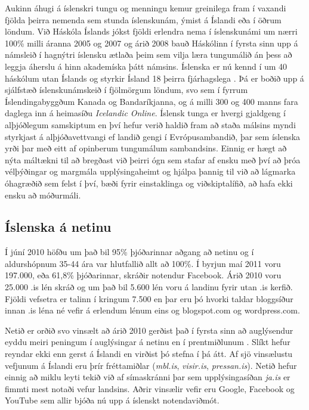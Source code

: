 \documentclass{../../metanetpaper}
\begin{document}
\begin{multicols}{2}
Aukinn áhugi á íslenskri tungu og menningu kemur greinilega fram í vaxandi fjölda þeirra nemenda sem stunda íslenskunám, ýmist á Íslandi eða í öðrum löndum. Við Háskóla Íslands jókst fjöldi erlendra nema í íslenskunámi um nærri 100\% milli áranna 2005 og 2007 og árið 2008 bauð Háskólinn í fyrsta sinn upp á námsleið í hagnýtri íslensku ætlaða þeim sem vilja læra tungumálið án þess að leggja áherslu á hinn akademíska þátt námsins. Íslenska er nú kennd í um 40 háskólum utan Íslands og styrkir Ísland 18 þeirra fjárhagslega \cite{isl1}.  Þá er boðið upp á sjálfstæð íslenskunámskeið í fjölmörgum löndum, svo sem í fyrrum Íslendingabyggðum Kanada og Bandaríkjanna, og á milli 300 og 400 manns fara daglega inn á heimasíðu \textit{Icelandic Online}\cite{iol1}.  Íslensk tunga er hvergi gjaldgeng í alþjóðlegum samskiptum en því hefur verið haldið fram að staða málsins myndi styrkjast á alþjóðavettvangi ef landið gengi í Evrópusambandið\cite{vis1}, þar sem íslenska yrði þar með eitt af opinberum tungumálum sambandsins\cite{enl1}.  Einnig er hægt að nýta máltækni til að bregðast við þeirri ógn sem stafar af ensku með því að þróa vélþýðingar og margmála upplýsingaheimt og hjálpa þannig til við að lágmarka óhagræðið sem felst í því, bæði fyrir einstaklinga og viðskiptalífið, að hafa ekki ensku að móðurmáli.

\subsection{Íslenska á netinu}

Í júní 2010 höfðu um það bil 95\% þjóðarinnar aðgang að netinu \cite{sta1} og í aldurshópnum 35-44 ára var hlutfallið allt að 100\%. Í byrjun maí 2011 voru 197.000, eða 61,8\% þjóðarinnar, skráðir notendur Facebook\cite{fac1}.   Árið 2010 voru 25.000 .is lén skráð\cite{len1} og um það bil 5.600 lén voru á landinu fyrir utan .is kerfið\cite{len2}. Fjöldi vefsetra er talinn í kringum 7.500 en þar eru þó hvorki taldar bloggsíður innan .is léna né vefir á erlendum lénum eins og blogspot.com og wordpress.com.

Netið er orðið svo vinsælt að árið 2010 gerðist það í fyrsta sinn að auglýsendur eyddu meiri peningum í auglýsingar á netinu en í prentmiðlunum \cite{abs1}. Slíkt hefur reyndar ekki enn gerst á Íslandi en virðist þó stefna í þá átt. Af sjö vinsælustu vefjunum á Íslandi eru þrír fréttamiðlar (\textit{mbl.is}, \textit{visir.is}, \textit{pressan.is}). Netið hefur einnig að miklu leyti tekið við af símaskránni þar sem upplýsingasíðan \textit{ja.is} er fimmti mest notaði vefur landsins. Aðrir vinsælir vefir eru Google, Facebook og YouTube\cite{abs2} sem allir bjóða nú upp á íslenskt notendaviðmót.


\end{multicols}
\end{document}
